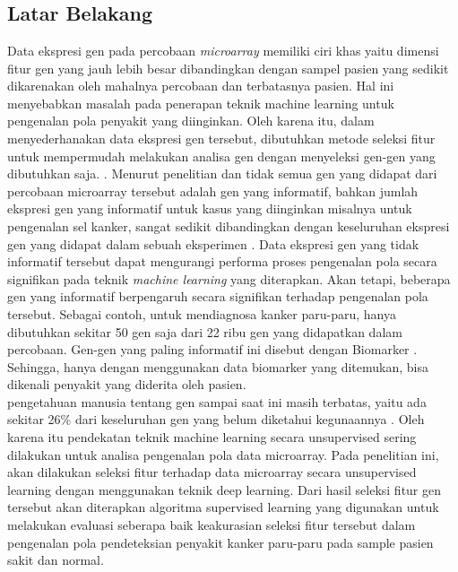 \chapter{\babSatu}

\section{Latar Belakang}
Data ekspresi gen pada percobaan \textit{microarray} memiliki ciri khas yaitu dimensi fitur gen yang jauh lebih besar dibandingkan dengan sampel pasien yang sedikit dikarenakan oleh mahalnya percobaan dan terbatasnya pasien. Hal ini menyebabkan masalah pada penerapan teknik machine learning untuk pengenalan pola penyakit yang diinginkan. Oleh karena itu, dalam menyederhanakan data ekspresi gen tersebut, dibutuhkan metode seleksi fitur untuk mempermudah melakukan analisa gen dengan menyeleksi gen-gen yang dibutuhkan saja. \citep{yoon2006building}. Menurut penelitian \cite{yoon2006building} dan \cite{bandyopadhyay2014survey} tidak semua gen yang didapat dari percobaan microarray tersebut adalah gen yang informatif, bahkan jumlah ekspresi gen yang informatif untuk kasus yang diinginkan misalnya untuk pengenalan sel kanker, sangat sedikit dibandingkan dengan keseluruhan ekspresi gen yang didapat dalam sebuah eksperimen \citep{bandyopadhyay2014survey}. Data ekspresi gen yang tidak informatif tersebut dapat mengurangi performa  proses pengenalan pola secara signifikan pada teknik \textit{machine learning} yang diterapkan. Akan tetapi, beberapa gen yang informatif berpengaruh secara signifikan terhadap pengenalan pola tersebut. Sebagai contoh, untuk mendiagnosa kanker paru-paru, hanya dibutuhkan sekitar 50 gen saja dari 22 ribu gen yang didapatkan dalam percobaan. Gen-gen yang paling informatif ini disebut dengan Biomarker \citep{belinsky2004gene}. Sehingga, hanya dengan menggunakan data biomarker yang ditemukan, bisa dikenali penyakit yang diderita oleh pasien.\\
pengetahuan manusia tentang gen sampai saat ini masih terbatas, yaitu ada sekitar 26\% dari keseluruhan gen yang belum diketahui kegunaannya \citep{haggstrom2014diagram}. Oleh karena itu pendekatan teknik machine learning secara unsupervised sering dilakukan untuk analisa pengenalan pola data microarray. Pada penelitian ini, akan dilakukan seleksi fitur terhadap data microarray secara unsupervised learning dengan menggunakan teknik deep learning. Dari hasil seleksi fitur gen tersebut akan diterapkan algoritma supervised learning yang digunakan untuk melakukan evaluasi seberapa baik keakurasian seleksi fitur tersebut dalam pengenalan pola pendeteksian penyakit kanker paru-paru pada sample pasien sakit dan normal. \\
